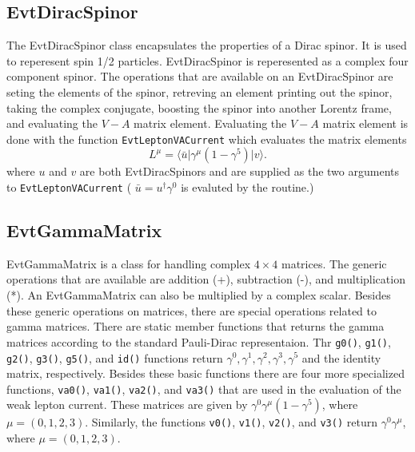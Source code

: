 \subsection{EvtDiracSpinor}

The EvtDiracSpinor class encapsulates the properties of
a Dirac spinor. It is used to reperesent spin 1/2 particles.
EvtDiracSpinor is reperesented as a complex four component 
spinor. The operations that are available on an EvtDiracSpinor 
are seting the elements of the spinor, retreving an element
printing out the spinor, taking the complex conjugate, boosting
the spinor into another Lorentz frame, and evaluating the
$V-A$ matrix element. Evaluating the $V-A$ matrix element
is done with the function {\tt EvtLeptonVACurrent} which evaluates
the matrix elements
\begin{equation}
L^{\mu}=\langle \bar u \vert \gamma^{\mu}(1-\gamma^5) \vert v \rangle.
\end{equation}
where $u$ and $v$ are both EvtDiracSpinors and are supplied as the
two arguments to {\tt EvtLeptonVACurrent} ( $\bar u=u^{\dag}\gamma^0$ is
evaluted by the routine.)




\subsection{EvtGammaMatrix}

EvtGammaMatrix is a class for handling 
complex $4\times 4$ matrices.
The generic operations that are available are 
addition (+), subtraction (-),
and multiplication (*). An EvtGammaMatrix can also
be multiplied by a complex scalar. 
Besides these
generic operations on matrices, there are special 
operations related to gamma matrices. There are
static member functions that returns the gamma matrices according
to the standard Pauli-Dirac representaion.
Thr {\tt g0()}, {\tt g1()}, {\tt g2()}, {\tt g3()}, {\tt g5()}, 
and {\tt id()} functions return
$\gamma^0,\gamma^1,\gamma^2,\gamma^3,\gamma^5$ and the identity matrix,
respectively. Besides these
basic functions there are four more specialized functions,
{\tt va0()}, {\tt va1()}, {\tt va2()}, and {\tt va3()} that are 
used in the evaluation of the
weak lepton current. These matrices are given by 
$\gamma^0\gamma^{\mu}(1-\gamma^5)$, where $\mu=(0,1,2,3)$.
Similarly, the functions {\tt v0()}, {\tt v1()}, {\tt v2()}, 
and {\tt v3()} return $\gamma^0\gamma^{\mu}$, where $\mu=(0,1,2,3)$.

